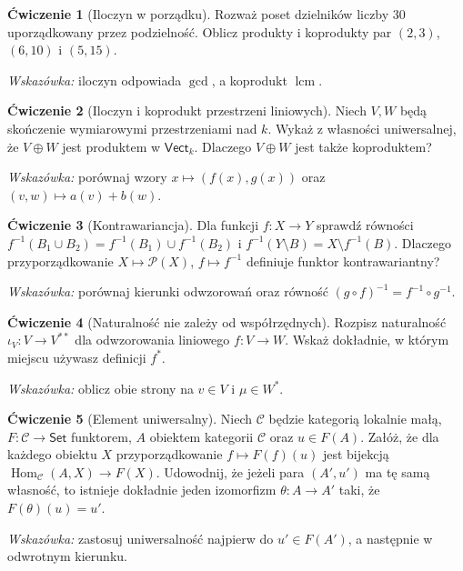\documentclass[11pt,a4paper]{article}
\numberwithin{equation}{section}
\theoremstyle{plain}
\theoremstyle{definition}
\newtheorem{cwiczenie}{Ćwiczenie}
\theoremstyle{remark}
\newcommand{\cat}[1]{\mathsf{#1}}
\newcommand{\Set}{\cat{Set}}
\newcommand{\Vect}{\cat{Vect}}
\newcommand{\Hom}{\operatorname{Hom}}
\begin{document}
\begin{cwiczenie}[Iloczyn w porządku]
Rozważ poset dzielników liczby $30$ uporządkowany przez podzielność. Oblicz produkty i koprodukty par $(2,3)$, $(6,10)$ i $(5,15)$.

\emph{Wskazówka:} iloczyn odpowiada $\gcd$, a koprodukt $\operatorname{lcm}$.
\end{cwiczenie}

\begin{cwiczenie}[Iloczyn i koprodukt przestrzeni liniowych]
Niech $V,W$ będą skończenie wymiarowymi przestrzeniami nad $k$. Wykaż z własności uniwersalnej, że $V\oplus W$ jest produktem w $\Vect_k$. Dlaczego $V\oplus W$ jest także koproduktem?

\emph{Wskazówka:} porównaj wzory $x\mapsto(f(x),g(x))$ oraz $(v,w)\mapsto a(v)+b(w)$.
\end{cwiczenie}

\begin{cwiczenie}[Kontrawariancja]
Dla funkcji $f:X\to Y$ sprawdź równości $f^{-1}(B_1\cup B_2)=f^{-1}(B_1)\cup f^{-1}(B_2)$ i $f^{-1}(Y\setminus B)=X\setminus f^{-1}(B)$. Dlaczego przyporządkowanie $X\mapsto\mathcal P(X)$, $f\mapsto f^{-1}$ definiuje funktor kontrawariantny?

\emph{Wskazówka:} porównaj kierunki odwzorowań oraz równość $(g\circ f)^{-1}=f^{-1}\circ g^{-1}$.
\end{cwiczenie}

\begin{cwiczenie}[Naturalność nie zależy od współrzędnych]
Rozpisz naturalność $\iota_V:V\to V^{**}$ dla odwzorowania liniowego $f:V\to W$. Wskaż dokładnie, w którym miejscu używasz definicji $f^*$.

\emph{Wskazówka:} oblicz obie strony na $v\in V$ i $\mu\in W^*$.
\end{cwiczenie}

\begin{cwiczenie}[Element uniwersalny]
Niech $\mathcal C$ będzie kategorią lokalnie małą, $F:\mathcal C\to\Set$ funktorem, $A$ obiektem kategorii $\mathcal C$ oraz $u\in F(A)$. Załóż, że dla każdego obiektu $X$ przyporządkowanie $f\mapsto F(f)(u)$ jest bijekcją $\Hom_{\mathcal C}(A,X)\to F(X)$. Udowodnij, że jeżeli para $(A',u')$ ma tę samą własność, to istnieje dokładnie jeden izomorfizm $\theta:A\to A'$ taki, że $F(\theta)(u)=u'$.

\emph{Wskazówka:} zastosuj uniwersalność najpierw do $u'\in F(A')$, a następnie w odwrotnym kierunku.
\end{cwiczenie}
\end{document}
